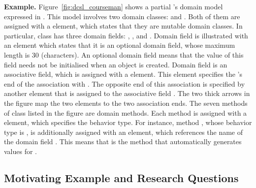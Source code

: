 
\noindent \textbf{Example.} Figure~\ref{fig:dcsl_courseman} shows a partial \courseman's domain model expressed in \dcsl. This model involves two domain classes:  and . 
Both of them are assigned with a  element, which states that they are mutable domain classes. In particular, class  has three domain fields: , , and . Domain field  is illustrated with an  element which states that it is an optional domain field, whose maximum length is 30 (characters). An optional domain field means that the value of this field needs not be initialised when an object is created. Domain field  is an associative field, which is assigned with a  element. This element specifies the 's end of the association with . The opposite end of this association is specified by another  element that is assigned to the associative field . The two thick arrows in the figure map the two  elements to the two association ends. 
%
The seven methods of class  listed in the figure are domain methods. Each method is assigned with a  element, which specifies the behavior type. For instance, method , whose behavior type is , is additionally assigned with an  element, which references the name of the domain field . This means that  is the method that automatically generates values for .

\subsection{Motivating Example and Research Questions} 
\label{sect:bg-courseman-eg}

